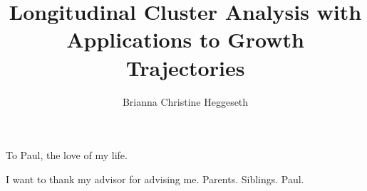\documentclass{ucbthesis}
\begin{document}

\title{Longitudinal Cluster Analysis with Applications to Growth Trajectories}
\author{Brianna Christine Heggeseth}




\maketitle
\approvalpage
\copyrightpage



\begin{frontmatter}

\begin{dedication}
\null\vfil
\begin{center}
To Paul, the love of my life.\\\vspace{12pt}

\end{center}
\vfil\null
\end{dedication}

\tableofcontents
\clearpage
\listoffigures
\clearpage
\listoftables

\begin{acknowledgements}
I want to thank my advisor for advising me. Parents. Siblings. Paul.
\end{acknowledgements}

\end{frontmatter}

\pagestyle{headings}











\printbibliography

\appendix
%
%
\end{document}
